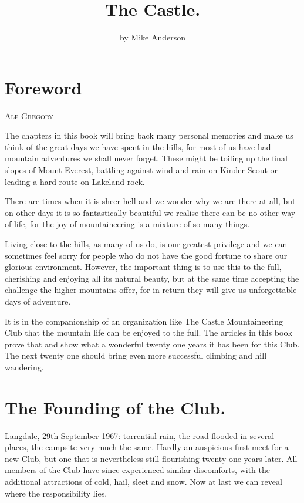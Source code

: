 \documentclass[a5paper,openany,font 10pt]{scrbook}
\date{}
\title{The Castle.}
\makeatletter
\newcommand{\chapterauthor}[1]{%
{\parindent0pt\vspace*{-5pt}%
\linespread{1.1}\large\scshape#1%
\par\nobreak\vspace*{35pt}}
\@afterheading%
}
\makeatother
\begin{document}



\tableofcontents


\chapter{Foreword}
\label{sec:org81e3a1a}
\chapterauthor{Alf Gregory}
The chapters in this book will bring back many personal memories and
make us think of the great days we have spent in the hills, for most
of us have had mountain adventures we shall never forget. These might
be toiling up the final slopes of Mount Everest, battling against wind
and rain on Kinder Scout or leading a hard route on Lakeland rock.

There are times when it is sheer hell and we wonder why we are there
at all, but on other days it is so fantastically beautiful we realise
there can be no other way of life, for the joy of mountaineering is a
mixture of so many things.

Living close to the hills, as many of us do, is our greatest privilege
and we can sometimes feel sorry for people who do not have the good
fortune to share our glorious environment. However, the important
thing is to use this to the full, cherishing and enjoying all its
natural beauty, but at the same time accepting the challenge the
higher mountains offer, for in return they will give us unforgettable
days of adventure.

It is in the companionship of an organization like The Castle
Mountaineering Club that the mountain life can be enjoyed to the
full. The articles in this book prove that and show what a wonderful
twenty one years it has been for this Club. The next twenty one should
bring even more successful climbing and hill wandering.

\chapter{The Founding of the Club.}
\label{sec:orgc4ebc9c}
\author{by Mike Anderson}
Langdale, 29th September 1967: torrential rain, the road flooded in
several places, the campsite very much the same. Hardly an auspicious
first meet for a new Club, but one that is nevertheless still
flourishing twenty one years later. All members of the Club have since
experienced similar discomforts, with the additional attractions of
cold, hail, sleet and snow. Now at last we can reveal where the
responsibility lies.
\end{document}
